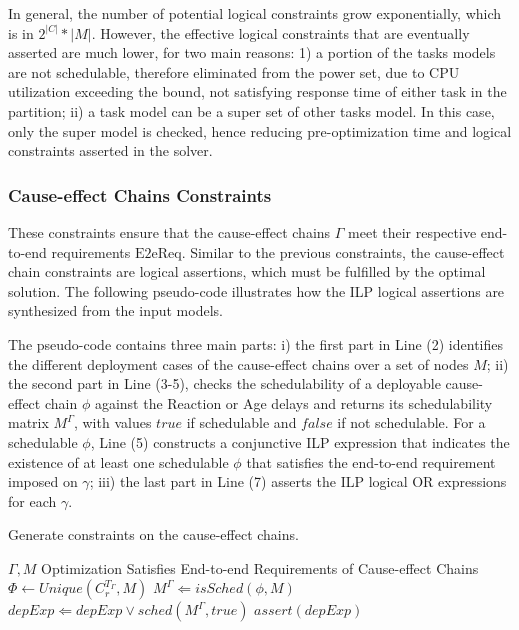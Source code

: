 In general, the number of potential logical constraints grow exponentially, which is in $2^{|C|}*|M|$. However, the effective logical constraints that are eventually asserted are much lower, for two main reasons: 1) a portion of the tasks models are not schedulable, therefore eliminated from the power set, due to CPU utilization exceeding the bound, not satisfying response time of either task in the partition; ii) a task model can be a super set of other tasks model. In this case, only the super model is checked, hence reducing pre-optimization time and logical constraints asserted in the solver.

\subsubsection*{Cause-effect Chains Constraints}
These constraints ensure that the cause-effect chains $\Gamma$ meet their respective end-to-end requirements $\mathrm{E2eReq}$. Similar to the previous constraints, the cause-effect chain constraints are logical assertions, which must be fulfilled by the optimal solution. The following pseudo-code illustrates how the ILP logical assertions are synthesized from the input models. 

The pseudo-code contains three main parts: i) the first part in Line (2) identifies the different deployment cases of the cause-effect chains over a set of nodes $M$; ii) the second part in Line (3-5), checks the schedulability of a deployable cause-effect chain $\phi$ against the Reaction or Age delays  \cite{mubeen2013support} and returns its schedulability matrix $M^\Gamma$, with values $true$ if schedulable and $false$ if not schedulable. For a schedulable $\phi$, Line (5) constructs a conjunctive ILP expression that indicates the existence of at least one schedulable $\phi$ that satisfies the end-to-end requirement imposed on $\gamma$; iii) the last part in Line (7) asserts the ILP logical OR expressions for each $\gamma$.
\begin{algorithm}
\caption{Generate constraints on the cause-effect chains.}\label{alg_causeeffectchains}
\begin{algorithmic}[1]
\Require $\Gamma,M$
\Ensure Optimization Satisfies End-to-end Requirements of Cause-effect Chains
\ForAll{$\gamma \in \Gamma$}
\State $\Phi\leftarrow Unique(C^{T_\Gamma}_r, M)$ 
	\ForAll{$\phi \in \Phi$}
    \State $M^\Gamma\Leftarrow isSched(\phi, M)$
    \State $depExp\Leftarrow depExp \lor sched(M^\Gamma, true)$
    \EndFor
	\State $assert(depExp)$
\EndFor
\end{algorithmic}
\end{algorithm}

